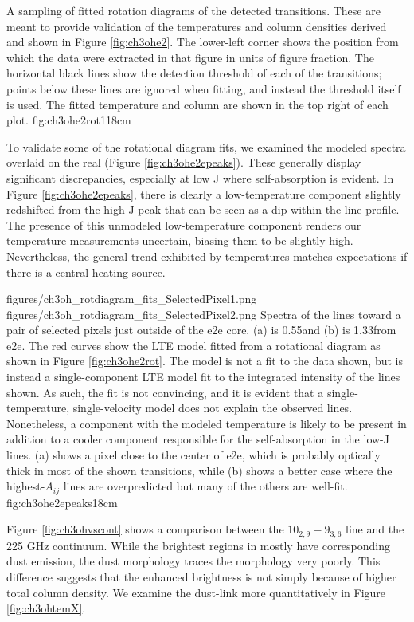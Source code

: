 \documentclass{emulateapj}
\begin{document}
{A sampling of fitted rotation diagrams of the detected \methanol transitions.
These are meant to provide validation of the temperatures and column densities
derived and shown in Figure \ref{fig:ch3ohe2}.  The lower-left corner shows
the position from which the data were extracted in that figure in units of
figure fraction.  The horizontal black lines show the detection threshold of each
of the transitions; points below these lines are ignored when fitting, and instead
the threshold itself is used.  The fitted temperature and
column are shown in the top right of each plot.
}{fig:ch3ohe2rot}{1}{18cm}

To validate some of the rotational diagram fits, we examined the modeled
spectra overlaid on the real (Figure \ref{fig:ch3ohe2epeaks}).  These generally
display significant discrepancies, especially at low J where self-absorption is
evident.  In Figure \ref{fig:ch3ohe2epeaks}, there is clearly a low-temperature
component slightly redshifted from the high-J peak that can be seen as a dip
within the line profile.  The presence of this unmodeled low-temperature
component renders our \methanol temperature measurements uncertain, biasing
them to be slightly high.  Nevertheless,
the general trend exhibited by \methanol temperatures matches expectations
if there is a central heating source.



\FigureTwo
{figures/ch3oh_rotdiagram_fits_SelectedPixel1.png}
{figures/ch3oh_rotdiagram_fits_SelectedPixel2.png}
{Spectra of the \methanol lines toward a pair of selected pixels just outside
of the e2e core. (a) is 0.55\arcsec  and (b) is 1.33\arcsec from e2e.  The red
curves show the LTE model fitted from a rotational diagram as shown in Figure
\ref{fig:ch3ohe2rot}.  The model is not a fit to the data shown, but is instead
a single-component LTE model fit to the integrated intensity of the lines
shown.  As such, the fit is not convincing, and it is evident that a
single-temperature, single-velocity model does not explain the observed lines.
Nonetheless, a component with the modeled temperature is likely to be present
in addition to a cooler component responsible for the self-absorption in the
low-J lines.  (a) shows a pixel close to the center of e2e, which is probably
optically thick in most of the shown transitions, while (b) shows a better case
where the highest-$A_{ij}$ lines are overpredicted but many of the others are
well-fit.}
{fig:ch3ohe2epeaks}{1}{8cm}

Figure \ref{fig:ch3ohvscont} shows a comparison between the \methanol
$10_{2,9}-9_{3,6}$ line and the 225 GHz continuum.  While the brightest regions
in \methanol mostly have corresponding dust emission, the dust morphology
traces the \methanol morphology very poorly.  This difference suggests that the
enhanced brightness is not simply because of higher total column density.
We examine the dust-\methanol link more quantitatively in Figure
\ref{fig:ch3ohtemX}.
\end{document}
